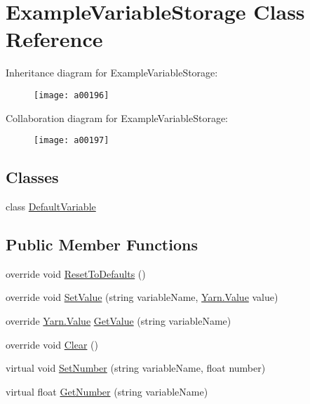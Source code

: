 \hypertarget{a00047}{\section{Example\-Variable\-Storage Class Reference}
\label{a00047}
}


Inheritance diagram for Example\-Variable\-Storage\-:
\nopagebreak
\begin{figure}[H]
\begin{center}
\leavevmode
\texttt{[image: a00196]}
\end{center}
\end{figure}


Collaboration diagram for Example\-Variable\-Storage\-:
\nopagebreak
\begin{figure}[H]
\begin{center}
\leavevmode
\texttt{[image: a00197]}
\end{center}
\end{figure}
\subsection*{Classes}
\begin{DoxyCompactItemize}
\item 
class \hyperlink{a00047_a00179}{Default\-Variable}
\end{DoxyCompactItemize}
\subsection*{Public Member Functions}
\begin{DoxyCompactItemize}
\item 
override void \hyperlink{a00047_a3a05d66cdacadb2e9b618cd0aef45f84}{Reset\-To\-Defaults} ()
\item 
override void \hyperlink{a00047_ac4265c1c9da485f13a6b05784b0f668d}{Set\-Value} (string variable\-Name, \hyperlink{a00100}{Yarn.\-Value} value)
\item 
override \hyperlink{a00100}{Yarn.\-Value} \hyperlink{a00047_a741593be1a299dcc2136f05b9b4a995a}{Get\-Value} (string variable\-Name)
\item 
override void \hyperlink{a00047_a0ce614bee8d5b220500fb765390b4ca3}{Clear} ()
\item 
virtual void \hyperlink{a00103_ac0d2f2e081944ad197992a26ad1a833c}{Set\-Number} (string variable\-Name, float number)
\item 
virtual float \hyperlink{a00103_add85a45dd65a5d4bd41c9d5ce5f77d19}{Get\-Number} (string variable\-Name)
\end{DoxyCompactItemize}

